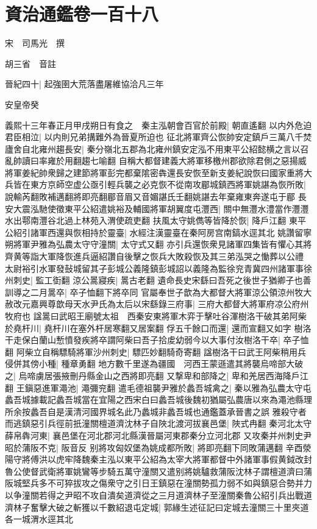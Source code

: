 \chapter{資治通鑑卷一百十八}


宋　司馬光　撰

胡三省　音註

晉紀四十|{
	起強圉大荒落盡屠維協洽凡三年}


安皇帝癸

義熙十三年春正月甲戌朔日有食之　秦主泓朝會百官於前殿|{
	朝直遙翻}
以内外危迫君臣相泣|{
	以内則兄弟搆難外為晉夏所迫也}
征北將軍齊公恢帥安定鎮戶三萬八千焚廬舍自北雍州趨長安|{
	秦分嶺北五郡為北雍州鎮安定泓不用東平公紹懿横之言以召亂帥讀曰率雍於用翻趨七喻翻}
自稱大都督建義大將軍移檄州郡欲除君側之惡揚威將軍姜紀帥衆歸之建節將軍彭完都棄隂密犇還長安恢至新支姜紀說恢曰國家重將大兵皆在東方京師空虚公亟引輕兵襲之必克恢不從南攻郿城鎮西將軍姚諶為恢所敗|{
	說輸芮翻敗補邁翻將即亮翻郿音眉又音媚諶氏壬翻姚諶去年棄雍東奔遂屯于郿}
長安大震泓馳使徵東平公紹遣姚裕及輔國將軍胡翼度屯灃西|{
	關中無灃水澧當作灃灃水出鄠南灃谷北過上林苑入渭使疏吏翻}
扶風太守姚儁等皆降於恢|{
	降戶江翻}
東平公紹引諸軍西還與恢相持於靈臺|{
	水經注漢靈臺在秦阿房宫南鎬水逕其北}
姚讚留寧朔將軍尹雅為弘農太守守潼關|{
	太守式又翻}
亦引兵還恢衆見諸軍四集皆有懼心其將齊黄等詣大軍降恢進兵逼紹讚自後擊之恢兵大敗殺恢及其三弟泓哭之慟葬以公禮　太尉裕引水軍發鼔城留其子彭城公義隆鎮彭城詔以義隆為監徐兖青冀四州諸軍事徐州刺史|{
	監工衘翻}
涼公暠寢疾|{
	暠古老翻}
遺命長史宋繇曰吾死之後世子猶卿子也善訓導之二月暠卒|{
	卒子恤翻下將卒同}
官屬奉世子歆為大都督大將軍涼公領涼州牧大赦改元嘉興尊歆母天水尹氏為太后以宋繇錄三府事|{
	三府大都督大將軍府凉公府州牧府也}
諡暠曰武昭王廟號太祖　西秦安東將軍木弈于擊吐谷渾樹洛干破其弟阿柴於堯杆川|{
	堯杆川在塞外杆居寒翻又居案翻}
俘五千餘口而還|{
	還而宣翻又如字}
樹洛干走保白蘭山慙憤發疾將卒謂阿柴曰吾子拾䖍幼弱今以大事付汝樹洛干卒|{
	卒子恤翻}
阿柴立自稱驃騎將軍沙州刺史|{
	驃匹妙翻騎奇寄翻}
諡樹洛干曰武王阿柴稍用兵侵併其傍小種|{
	種章勇翻}
地方數千里遂為疆國　河西王蒙遜遣其將襲烏啼部大破之|{
	烏啼虜居張掖刪丹縣金山之西將即亮翻}
又撃卑和部降之|{
	卑和羌居西海降戶江翻}
王鎭惡進軍澠池|{
	澠彌兖翻}
遣毛德祖襲尹雅於蠡吾城禽之|{
	秦以雅為弘農太守屯蠡吾城據載記蠡吾城當在宜陽之西宋白曰蠡吾城後魏初猶屬弘農唐以來為澠池縣理所余按蠡吾自是漢清河國界城名此乃蠡城非蠡吾城也通鑑蓋承晉書之誤}
雅殺守者而逃鎮惡引兵徑前扺潼關檀道濟沈林子自陜北渡河拔襄邑堡|{
	陜式冉翻}
秦河北太守薛帛犇河東|{
	襄邑堡在河北郡河北縣漢晉屬河東郡秦分立河北郡}
又攻秦并州刺史尹昭於蒲阪不克|{
	阪音反}
别將攻匈奴堡為姚成都所敗|{
	將即亮翻下同敗蒲邁翻}
辛酉滎陽守將傅洪以虎牢降魏秦主泓以東平公紹為太宰大將軍都督中外諸軍事假黄鉞改封魯公使督武衛將軍姚鸞等步騎五萬守潼關又遣别將姚驢救蒲阪沈林子謂檀道濟曰蒲阪城堅兵多不可猝拔攻之傷衆守之引日王鎮惡在潼關勢孤力弱不如與鎮惡合勢并力以争潼關若得之尹昭不攻自潰矣道濟從之三月道濟林子至潼關秦魯公紹引兵出戰道濟林子奮擊大破之斬獲以千數紹退屯定城|{
	郭緣生述征記曰定城去潼關三十里夾道各一城渭水逕其北}
